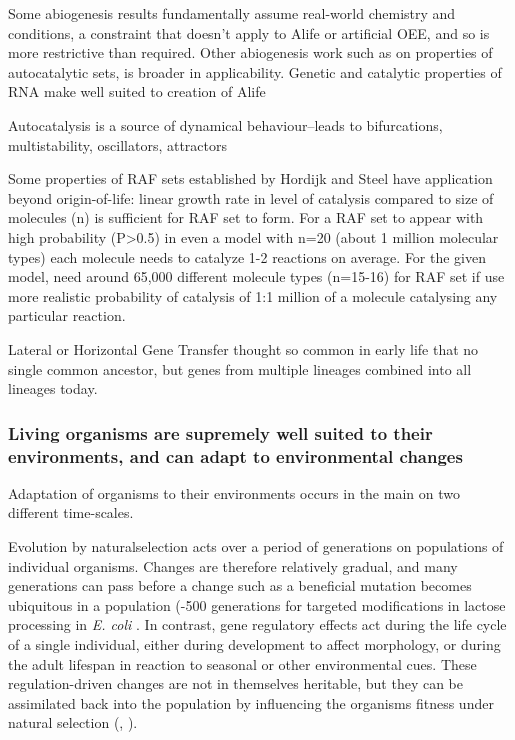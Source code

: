 	Some abiogenesis results fundamentally assume real-world chemistry and
	conditions, a constraint that doesn't apply to Alife or artificial OEE,
	and so is more restrictive than required. Other abiogenesis work such as
	on properties of autocatalytic sets, is broader in applicability.
	Genetic and catalytic properties of RNA make well suited to creation of
	Alife \autocite{Cheng2010}
	
	Autocatalysis is a source of dynamical behaviour--leads to
	bifurcations, multistability, oscillators, attractors
	\autocite{Plasson2010}
	
	Some properties of RAF sets established by Hordijk and Steel have
	application beyond origin-of-life: linear growth rate in level of
	catalysis compared to size of molecules (n) is sufficient for RAF set to
	form. For a RAF set to appear with high probability (P\textgreater{}0.5)
	in even a model with n=20 (about 1 million molecular types) each
	molecule needs to catalyze 1-2 reactions on average. For the given
	model, need around 65,000 different molecule types (n=15-16) for RAF set
	if use more realistic probability of catalysis of 1:1 million of a
	molecule catalysing any particular reaction. \autocite{Hordijk2011}
	
	Lateral or Horizontal Gene Transfer thought so common in early life that
	no single common ancestor, but genes from multiple lineages combined
	into all lineages today.\autocite{Ragan2009}
	

\subsubsection{Living organisms are supremely well suited to their environments, and can adapt to environmental changes}
\label{living-organisms-are-supremely-well-suited-to-their-environments-and-can-adapt-to-environmental-changes}

Adaptation of organisms to their environments occurs in the main on two
different time-scales.

Evolution by \gls{naturalselection} acts over a period of generations on
populations of individual organisms. Changes are therefore relatively
gradual, and many generations can pass before a change such as a
beneficial mutation becomes ubiquitous in a population (-500
generations for targeted modifications in lactose processing in
\emph{E. coli} \autocite{Dekel:2005fk}. In contrast, gene regulatory
effects act during the life cycle of a single individual, either during
development to affect morphology, or during the adult lifespan in
reaction to seasonal or other environmental cues. These
regulation-driven changes are not in themselves heritable, but they can
be assimilated back into the population by influencing the organisms
fitness under natural selection (\eg,
\autocite{Baldwin:1896ly,Dennett:2003ve,Paenke:2009xe,Paenke:2007ve}).

